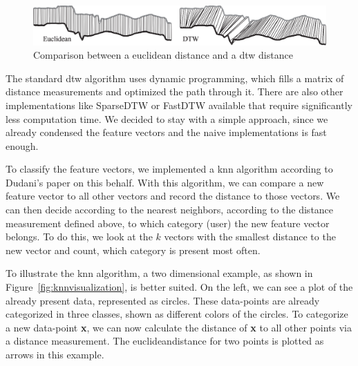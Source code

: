 \begin{figure}
    \centering
    \includegraphics[width=\textwidth]{figures/EuclideanvsDTW.png}
    \caption{Comparison between a euclidean distance and a \gls{dtw} distance\cite{keogh2005exact}}
    \label{fig:euclideandtw}
\end{figure}

The standard \gls{dtw} algorithm uses dynamic programming, which fills a matrix of distance measurements and optimized the path through it. There are also other implementations like SparseDTW or FastDTW available that require significantly less computation time. We decided to stay with a simple approach, since we already condensed the feature vectors and the naive implementations is fast enough.

To classify the feature vectors, we implemented a \gls{knn} algorithm according to Dudani's paper on this behalf\cite{dudani1976distance}. With this algorithm, we can compare a new feature vector to all other vectors and record the distance to those vectors. We can then decide according to the nearest neighbors, according to the distance measurement defined above, to which category (\ie user) the new feature vector belongs. To do this, we look at the $k$ vectors with the smallest distance to the new vector and count, which category is present most often.

To illustrate the \gls{knn} algorithm, a two dimensional example, as shown in Figure~\ref{fig:knnvisualization}, is better suited. On the left, we can see a plot of the already present data, represented as circles. These data-points are already categorized in three classes, shown as different colors of the circles. To categorize a new data-point \textbf{x}, we can now calculate the distance of \textbf{x} to all other points via a distance measurement. The \gls{euclideandistance} for two points is plotted as arrows in this example.

